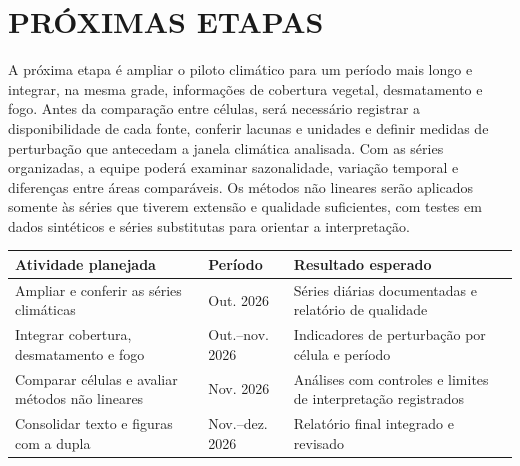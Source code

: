 \documentclass[12pt,a4paper]{article}
\begin{document}
\section*{PRÓXIMAS ETAPAS}

A próxima etapa é ampliar o piloto climático para um período mais longo e integrar, na mesma grade, informações de cobertura vegetal, desmatamento e fogo. Antes da comparação entre células, será necessário registrar a disponibilidade de cada fonte, conferir lacunas e unidades e definir medidas de perturbação que antecedam a janela climática analisada. Com as séries organizadas, a equipe poderá examinar sazonalidade, variação temporal e diferenças entre áreas comparáveis. Os métodos não lineares serão aplicados somente às séries que tiverem extensão e qualidade suficientes, com testes em dados sintéticos e séries substitutas para orientar a interpretação.

\small
\begin{tabularx}{\textwidth}{|X|p{2.2cm}|X|}\hline
Atividade planejada & Período & Resultado esperado\\\hline
Ampliar e conferir as séries climáticas & Out. 2026 & Séries diárias documentadas e relatório de qualidade\\\hline
Integrar cobertura, desmatamento e fogo & Out.--nov. 2026 & Indicadores de perturbação por célula e período\\\hline
Comparar células e avaliar métodos não lineares & Nov. 2026 & Análises com controles e limites de interpretação registrados\\\hline
Consolidar texto e figuras com a dupla & Nov.--dez. 2026 & Relatório final integrado e revisado\\\hline
\end{tabularx}
\normalsize
\end{document}
